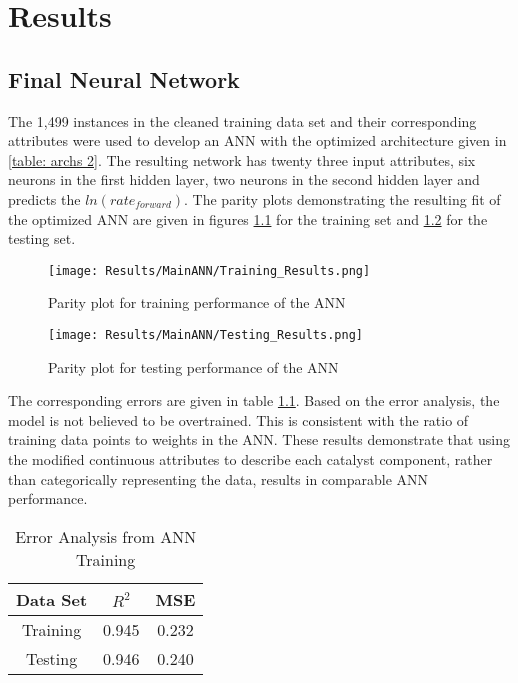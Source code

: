 \chapter{Results}
\label{ch:results}

\section{Final Neural Network}
The 1,499 instances in the cleaned training data set and their corresponding attributes were used to develop an ANN with the optimized architecture given in \ref{table: archs 2}. The resulting network has twenty three input attributes, six neurons in the first hidden layer, two neurons in the second hidden layer and predicts the $ln(rate_{forward})$. The parity plots demonstrating the resulting fit of the optimized ANN are given in figures \ref{fig:Main NN with the training/testing data} for the training set and \ref{fig:Main ANN testing data} for the testing set.  
		\begin{figure}[!htbp]
		    \centering
		    \texttt{[image: Results/MainANN/Training\_Results.png]}
	        \caption{Parity plot for training performance of the ANN}
	        \label{fig:Main NN with the training/testing data}
			\end{figure}
		\begin{figure}[!h]
		    \centering
		    \texttt{[image: Results/MainANN/Testing\_Results.png]}
	        \caption{Parity plot for testing performance of the ANN}
	        \label{fig:Main ANN testing data}
			\end{figure}
The corresponding errors are given in table \ref{table: training results}. Based on the error analysis, the model is not believed to be overtrained. This is consistent with the ratio of training data points to weights in the ANN. These results demonstrate that using the modified continuous attributes to describe each catalyst component, rather than categorically representing the data, results in comparable ANN performance.
		\begin{table}[!htbp]
			\centering
			\caption{Error Analysis from ANN Training}
			\label{table: training results}
			\begin{tabular}{c|cc}
			\textbf{Data Set} & \textbf{$R^2$} & \textbf{MSE} \\ \hline
			Training          & 0.945       & 0.232        \\
			Testing           & 0.946       & 0.240       
			\end{tabular}
			\end{table}
